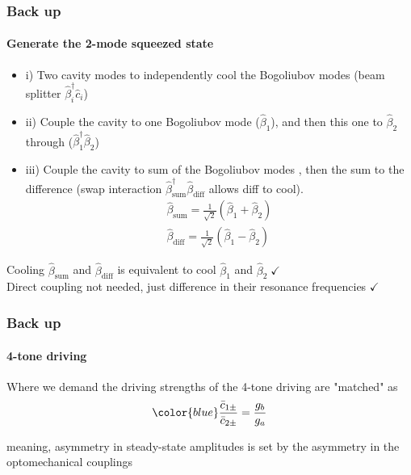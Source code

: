 \documentclass[aspectratio=43]{beamer}
\begin{document}
\begin{frame}
	
	\frametitle{Back up}
	\framesubtitle{Generate the 2-mode squeezed state}
	
	\begin{itemize}
		\item i) Two cavity modes to independently cool the Bogoliubov modes (beam splitter $\hat{\beta}^{\dagger}_{i} \hat{c}_{i}$)
		\item ii) Couple the cavity to one Bogoliubov mode ($\hat{\beta}_{1}$), and then this one to $\hat{\beta}_{2}$ through ($\hat{\beta}^{\dagger}_{1} \hat{\beta}_{2}$)
		\item iii) Couple the cavity to sum of the Bogoliubov modes , then the sum to the difference (swap interaction $\hat{\beta}^{\dagger}_{\textrm{sum}} \hat{\beta}_{\textrm{diff}}$ allows diff to cool).
		\begin{align}
		\hat{\beta}_{\textrm{sum}} = \frac{1}{\sqrt{2}}(\hat{\beta}_{1} + \hat{\beta}_{2}) \nonumber \\
		\hat{\beta}_{\textrm{diff}} = \frac{1}{\sqrt{2}}(\hat{\beta}_{1} - \hat{\beta}_{2}) \nonumber
		\end{align}
	\end{itemize}
	
	Cooling $\hat{\beta}_{\textrm{sum}}$ and $\hat{\beta}_{\textrm{diff}}$ is equivalent to cool $\hat{\beta}_{1}$ and $\hat{\beta}_{2} \; \checkmark$\\
	Direct coupling not needed, just difference in their resonance frequencies $\checkmark$

\end{frame}

\begin{frame}
	
	\frametitle{Back up}
	\framesubtitle{4-tone driving}
	
	Where we demand the driving strengths of the 4-tone driving are "matched" as
	\begin{equation}
		{\color{blue} \frac{\bar{c}_{1\pm}}{\bar{c}_{2\pm}} = \frac{g_{b}}{g_{a}}} \nonumber
	\end{equation}

	\vspace{0.5 cm}
	
	meaning, asymmetry in steady-state amplitudes is set by the asymmetry in the optomechanical couplings

\end{frame}
\end{document}
